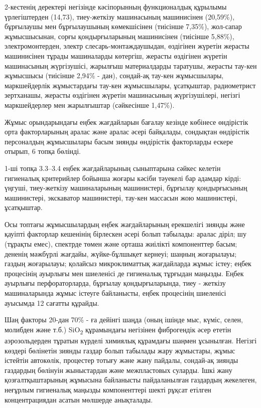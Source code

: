 \begin{multicols}{2}
2-кестенің деректері негізінде кәсіпорынның функционалдық құрылымы
үрлегіштерден (14,73), тиеу-жеткізу машинасының машинисінен (20,59\%),
бұрғылаушы мен бұрғылаушының көмекшісінен (тиісінше 7,35\%), жол-сапар
жұмысшысынан, сорғы қондырғыларының машинисінен (тиісінше 5,88\%),
электромонтерден, электр слесарь-монтаждаушыдан, өздігінен жүретін
жерасты машинисінен тұрады машиналарды көтергіш, жерасты өздігінен
жүретін машинасының жүргізушісі, жарылғыш материалдарды таратушы,
жерасты тау-кен жұмысшысы (тиісінше 2,94\% - дан), сондай-ақ тау-кен
жұмысшылары, маркшейдерлік жұмыстардағы тау-кен жұмысшылары, ұсатқыштар,
радиометрист зертханашы, жерасты өздігінен жүретін машинасының
жүргізушілері, негізгі маркшейдерлер мен жарылғыштар (сәйкесінше
1,47\%).

Жұмыс орындарындағы еңбек жағдайларын бағалау кезінде көбінесе
өндірістік орта факторларының аралас және аралас әсері байқалады,
сондықтан өндірістік персоналдың жұмысшылары басым зиянды өндірістік
факторларды ескере отырып, 6 топқа бөлінді.

1-ші топқа 3.3--3.4 еңбек жағдайларының сыныптарына сәйкес келетін
гигиеналық критерийлер бойынша жоғары кәсіби тәуекелі бар адамдар кірді:
үңгуші, тиеу-жеткізу машиналарының машинистері, бұрғылау қондырғысының
машинистері, экскаватор машинистері, тау-кен массасын жою машинистері,
ұсатқыштар.

Осы топтағы жұмысшылардың еңбек жағдайларының ерекшелігі зиянды және
қауіпті факторлар кешенінің бірлескен әсері болып табылады: аралас
діріл; шу (тұрақты емес), спектрде төмен және орташа жиілікті
компоненттер басым; дененің мәжбүрлі жағдайы, жүйке-бұлшықет кернеуі;
шаңның жоғарылауы; газдың жоғарылауы; қолайсыз микроклиматтық
жағдайларда жұмыс істеу; еңбек процесінің ауырлығы мен шиеленісі де
гигиеналық тұрғыдан маңызды. Еңбек ауырлығы перфораторларда, бұрғылау
қондырғыларында, тиеу - жеткізу машиналарында жұмыс істеуге байланысты,
еңбек процесінің шиеленісі ауысымда 12 сағатты құрайды.

Шаң факторы 20-дан 70\% - ға дейінгі шаңда (оның ішінде мыс, күміс,
селен, молибден және т.б.) SiO\textsubscript{2} құрамындағы негізінен
фиброгендік әсер ететін аэрозольдерден тұратын күрделі химиялық
құрамдағы шаңмен ұсынылған. Негізгі көздері бөлінетін зиянды газдар
болып табылады жару жұмыстары, жұмыс істейтін автокөлік, процестер
тотығу және жану пайдалы, сондай-ақ зиянды газдардың бөлінуін
жыныстардан және межпластовых суларды. Ішкі жану қозғалтқыштарының
жұмысына байланысты пайдаланылған газдардың жекелеген, неғұрлым
гигиеналық маңызды компоненттері шекті рұқсат етілген концентрациядан
асатын мөлшерде анықталады.


\end{multicols}
